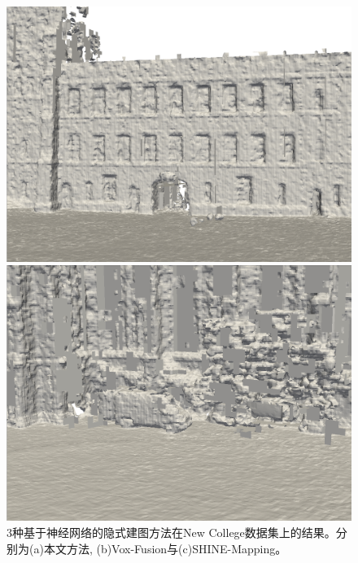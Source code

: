 \begin{figure}[htbp]
\begin{minipage}{0.322\linewidth}
    \end{minipage}\hfill
    \begin{minipage}{0.322\linewidth}
    \centering
    \includegraphics[width=1\linewidth]{figures/ncd_2_shine.png}
    \end{minipage}\hfill
    \begin{minipage}{0.322\linewidth}
        \centering
        \includegraphics[width=1\linewidth]{figures/ncd_1_shine.png}
        \end{minipage}
    \caption{3种基于神经网络的隐式建图方法在New College数据集上的结果。分别为(a)本文方法, (b)Vox-Fusion与(c)SHINE-Mapping。}\label{ncdresult}
\end{figure}

